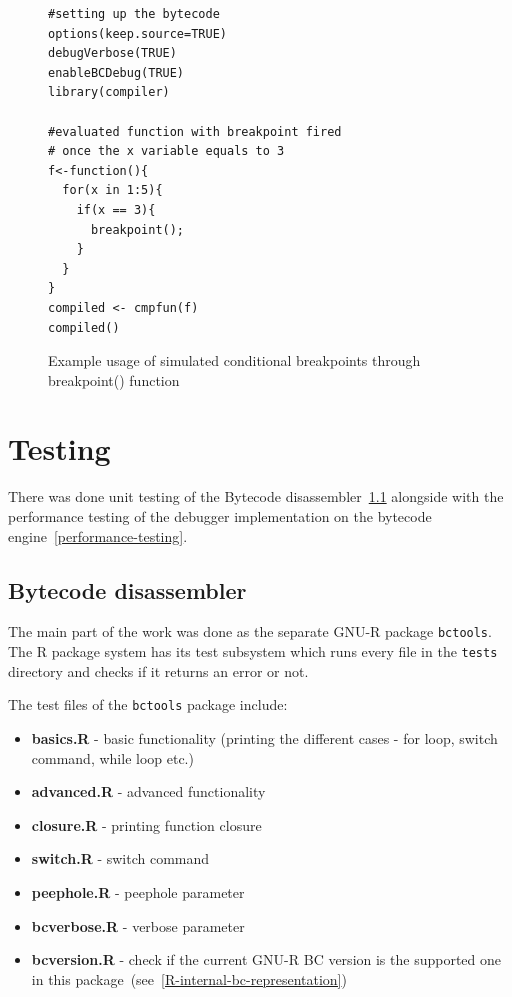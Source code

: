 \documentclass[thesis=M,english]{FITthesis}[2018/10/20]
\newcommand{\code}[1]{\texttt{#1}}
\begin{document}
{\begin{figure}[H]
\begin{lstlisting}
#setting up the bytecode
options(keep.source=TRUE)
debugVerbose(TRUE)
enableBCDebug(TRUE)
library(compiler)

#evaluated function with breakpoint fired
# once the x variable equals to 3
f<-function(){
  for(x in 1:5){
    if(x == 3){
      breakpoint();
    }
  }
}
compiled <- cmpfun(f)
compiled()
\end{lstlisting}
	\caption{Example usage of simulated conditional breakpoints through breakpoint() function}\label{fig:example-of-conditional-breakpoints}
\end{figure}

\chapter{Testing}\label{testing}

There was done unit testing of the Bytecode disassembler~\ref{bytecode-disassembler-testing} alongside with the performance testing of the debugger implementation on the bytecode engine~\ref{performance-testing}.

\section{Bytecode disassembler}\label{bytecode-disassembler-testing}

The main part of the work was done as the separate GNU-R package \code{bctools}. The R package system has its test subsystem which runs every file in the \code{tests} directory and checks if it returns an error or not.

The test files of the \code{bctools} package include:
\begin{itemize}
	\item \textbf{basics.R} - basic functionality (printing the different cases - for loop, switch command, while loop etc.)
	\item \textbf{advanced.R} - advanced functionality
	\item \textbf{closure.R} - printing function closure
	\item \textbf{switch.R} - switch command
	\item \textbf{peephole.R} - peephole parameter
	\item \textbf{bcverbose.R} - verbose parameter
	\item \textbf{bcversion.R} - check if the current GNU-R BC version is the supported one in this package~(see~\ref{R-internal-bc-representation})
\end{itemize}

}
\end{document}
